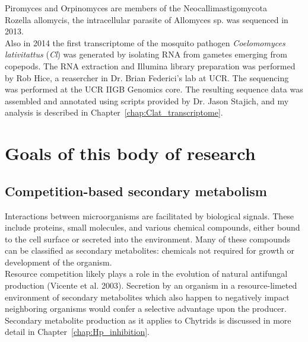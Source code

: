 \indent Piromyces and Orpinomyces are members of the Neocallimastigomycota \\
\indent Rozella allomycis, the intracellular parasite of Allomyces sp. was sequenced in 2013.\\
\indent Also in 2014 the first transcriptome of the mosquito pathogen \textit{Coelomomyces lativitattus} (\textit{Cl}) was generated by isolating RNA from gametes emerging from copepods. The RNA extraction and Illumina library preparation was performed by Rob Hice, a reasercher in Dr. Brian Federici's lab at UCR. The sequencing was performed at the UCR IIGB Genomics core. The resulting sequence data was assembled and annotated using scripts provided by Dr. Jason Stajich, and my analysis is described in Chapter~\ref{chap:Clat_transcriptome}.\\

\section{Goals of this body of research}
\subsection{Competition-based secondary metabolism}
Interactions between microorganisms are facilitated by biological signals. These include proteins, small molecules, and various chemical compounds, either bound to the cell surface or secreted into the environment. Many of these compounds can be classified as secondary metabolites: chemicals not required for growth or development of the organism.\\
\indent Resource competition likely plays a role in the evolution of natural antifungal production (Vicente et al. 2003). Secretion by an organism in a resource-limeted environment of secondary metabolites which also happen to negatively impact neighboring organisms would confer a selective advantage upon the producer. \\
\indent Secondary metabolite production as it applies to Chytrids is discussed in more detail in Chapter~\ref{chap:Hp_inhibition}.\\
